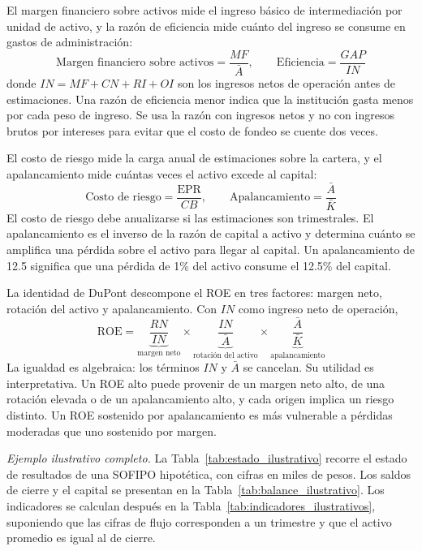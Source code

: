 El margen financiero sobre activos mide el ingreso básico de intermediación por unidad de activo, y la razón de eficiencia mide cuánto del ingreso se consume en gastos de administración:
\begin{equation}
\text{Margen financiero sobre activos}=\frac{MF}{\bar{A}}, \qquad \text{Eficiencia}=\frac{GAP}{IN}
\label{eq:margen_activo}
\end{equation}
donde $IN=MF+CN+RI+OI$ son los ingresos netos de operación antes de estimaciones. Una razón de eficiencia menor indica que la institución gasta menos por cada peso de ingreso. Se usa la razón con ingresos netos y no con ingresos brutos por intereses para evitar que el costo de fondeo se cuente dos veces.

El costo de riesgo mide la carga anual de estimaciones sobre la cartera, y el apalancamiento mide cuántas veces el activo excede al capital:
\begin{equation}
\text{Costo de riesgo}=\frac{\text{EPR}}{CB}, \qquad \text{Apalancamiento}=\frac{\bar{A}}{\bar{K}}
\label{eq:costo_riesgo}
\end{equation}
El costo de riesgo debe anualizarse si las estimaciones son trimestrales. El apalancamiento es el inverso de la razón de capital a activo y determina cuánto se amplifica una pérdida sobre el activo para llegar al capital. Un apalancamiento de 12.5 significa que una pérdida de 1\% del activo consume el 12.5\% del capital.

La identidad de DuPont descompone el ROE en tres factores: margen neto, rotación del activo y apalancamiento. Con $IN$ como ingreso neto de operación,
\begin{equation}
\text{ROE}=\underbrace{\frac{RN}{IN}}_{\text{margen neto}}\times\underbrace{\frac{IN}{\bar{A}}}_{\text{rotación del activo}}\times\underbrace{\frac{\bar{A}}{\bar{K}}}_{\text{apalancamiento}}
\label{eq:dupont}
\end{equation}
La igualdad es algebraica: los términos $IN$ y $\bar{A}$ se cancelan. Su utilidad es interpretativa. Un ROE alto puede provenir de un margen neto alto, de una rotación elevada o de un apalancamiento alto, y cada origen implica un riesgo distinto. Un ROE sostenido por apalancamiento es más vulnerable a pérdidas moderadas que uno sostenido por margen. %

\textit{Ejemplo ilustrativo completo.} La Tabla~\ref{tab:estado_ilustrativo} recorre el estado de resultados de una SOFIPO hipotética, con cifras en miles de pesos. Los saldos de cierre y el capital se presentan en la Tabla~\ref{tab:balance_ilustrativo}. Los indicadores se calculan después en la Tabla~\ref{tab:indicadores_ilustrativos}, suponiendo que las cifras de flujo corresponden a un trimestre y que el activo promedio es igual al de cierre.

